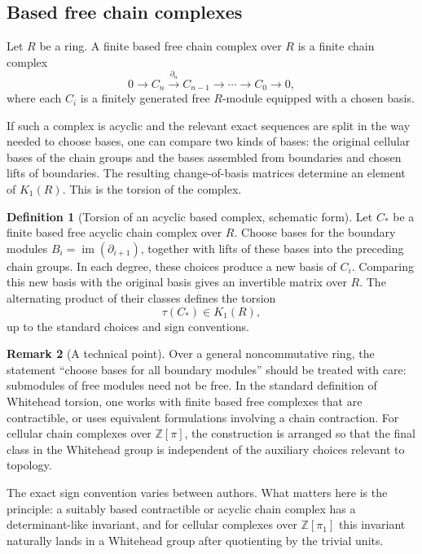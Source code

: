 \documentclass[11pt,a4paper]{article}
\newcommand{\im}{\operatorname{im}}
\newcommand{\ZZ}{\mathbb{Z}}
\theoremstyle{definition}
\newtheorem{definition}{Definition}[section]
\newtheorem{remark}[definition]{Remark}
\theoremstyle{plain}
\theoremstyle{remark}
\begin{document}
\subsection{Based free chain complexes}

Let \(R\) be a ring. A finite based free chain complex over \(R\) is a finite chain complex
\[
  0\longrightarrow C_n\xrightarrow{\partial_n} C_{n-1}
  \longrightarrow\cdots\longrightarrow C_0\longrightarrow 0,
\]
where each \(C_i\) is a finitely generated free \(R\)-module equipped with a chosen basis.

If such a complex is acyclic and the relevant exact sequences are split in the way needed to choose bases, one can compare two kinds of bases: the original cellular bases of the chain groups and the bases assembled from boundaries and chosen lifts of boundaries. The resulting change-of-basis matrices determine an element of \(K_1(R)\). This is the torsion of the complex.

\begin{definition}[Torsion of an acyclic based complex, schematic form]
Let \(C_*\) be a finite based free acyclic chain complex over \(R\). Choose bases for the boundary modules \(B_i=\im(\partial_{i+1})\), together with lifts of these bases into the preceding chain groups. In each degree, these choices produce a new basis of \(C_i\). Comparing this new basis with the original basis gives an invertible matrix over \(R\). The alternating product of their classes defines the torsion
\[
  \tau(C_*)\in K_1(R),
\]
up to the standard choices and sign conventions.
\end{definition}

\begin{remark}[A technical point]
Over a general noncommutative ring, the statement ``choose bases for all boundary modules'' should be treated with care: submodules of free modules need not be free. In the standard definition of Whitehead torsion, one works with finite based free complexes that are contractible, or uses equivalent formulations involving a chain contraction. For cellular chain complexes over \(\ZZ[\pi]\), the construction is arranged so that the final class in the Whitehead group is independent of the auxiliary choices relevant to topology.
\end{remark}

The exact sign convention varies between authors. What matters here is the principle: a suitably based contractible or acyclic chain complex has a determinant-like invariant, and for cellular complexes over \(\ZZ[\pi_1]\) this invariant naturally lands in a Whitehead group after quotienting by the trivial units.
\end{document}
